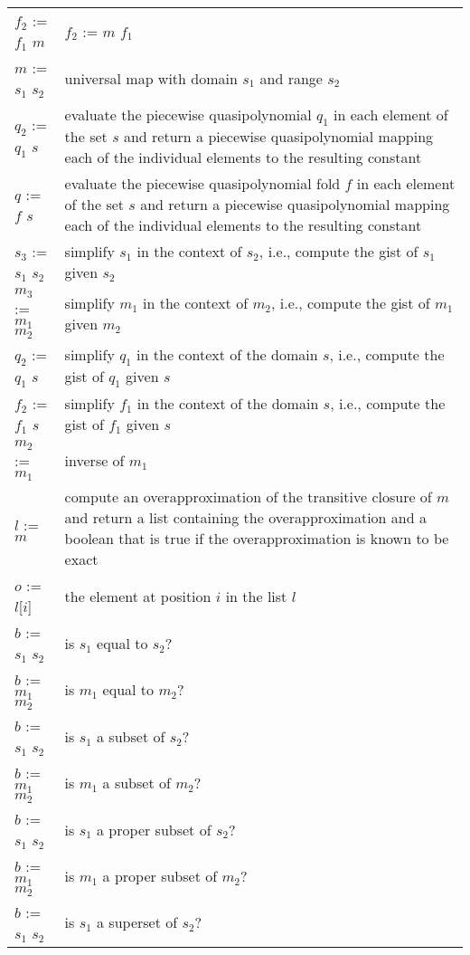 \begin{supertabular}{p{0.35\textwidth}p{0.6\textwidth}}
\\
$f_2$ := $f_1$  $m$ & $f_2$ := $m$  $f_1$
\\
$m$ := $s_1$ \ai[\tt]{->} $s_2$ & universal map with domain $s_1$
and range $s_2$
\\
$q_2$ := $q_1$  $s$ &
evaluate the piecewise quasipolynomial $q_1$ in each element
of the set $s$ and return a piecewise quasipolynomial
mapping each of the individual elements to the resulting
constant
\\
$q$ := $f$  $s$ &
evaluate the piecewise quasipolynomial fold $f$ in each element
of the set $s$ and return a piecewise quasipolynomial
mapping each of the individual elements to the resulting
constant
\\
$s_3$ := $s_1$ \ai[\tt]{\%} $s_2$ &
simplify $s_1$ in the context of $s_2$, i.e., compute
the gist of $s_1$ given $s_2$
\\
$m_3$ := $m_1$ \ai[\tt]{\%} $m_2$ &
simplify $m_1$ in the context of $m_2$, i.e., compute
the gist of $m_1$ given $m_2$
\\
$q_2$ := $q_1$ \ai[\tt]{\%} $s$ &
simplify $q_1$ in the context of the domain $s$, i.e., compute
the gist of $q_1$ given $s$
\\
$f_2$ := $f_1$ \ai[\tt]{\%} $s$ &
simplify $f_1$ in the context of the domain $s$, i.e., compute
the gist of $f_1$ given $s$
\\
$m_2$ := $m_1$ & inverse of $m_1$
\\
$l$ := $m$\ai[\tt]{\^{}+} &
compute an overapproximation of the transitive closure
of $m$ and return a list containing the overapproximation
and a boolean that is true if the overapproximation
is known to be exact
\\
$o$ := $l$[$i$] &
the element at position $i$ in the list $l$
\\
$b$ := $s_1$ \ai[\tt]{=} $s_2$ & is $s_1$ equal to $s_2$?
\\
$b$ := $m_1$ \ai[\tt]{=} $m_2$ & is $m_1$ equal to $m_2$?
\\
$b$ := $s_1$ \ai[\tt]{<=} $s_2$ & is $s_1$ a subset of $s_2$?
\\
$b$ := $m_1$ \ai[\tt]{<=} $m_2$ & is $m_1$ a subset of $m_2$?
\\
$b$ := $s_1$ \ai[\tt]{<} $s_2$ & is $s_1$ a proper subset of $s_2$?
\\
$b$ := $m_1$ \ai[\tt]{<} $m_2$ & is $m_1$ a proper subset of $m_2$?
\\
$b$ := $s_1$ \ai[\tt]{>=} $s_2$ & is $s_1$ a superset of $s_2$?
\\

\end{supertabular}
